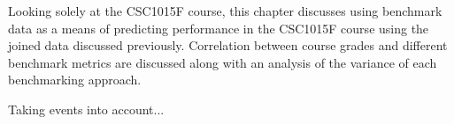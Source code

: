 Looking solely at the CSC1015F course, this chapter discusses using benchmark data as a means of predicting performance in the CSC1015F course using the joined data discussed previously. Correlation between course grades and different benchmark metrics are discussed along with an analysis of the variance of each benchmarking approach.

Taking events into account...